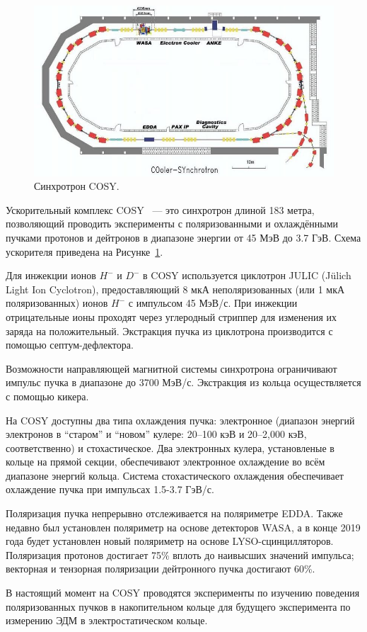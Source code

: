 
\begin{figure}[h]
	\centering
	\includegraphics[scale=.5]{images/chapter4/800px-COSY_Ring}
	\caption{Синхротрон COSY.\label{fig:COSY_Ring}}
\end{figure}

Ускорительный комплекс COSY~\cite{COSY-Ring} --- это синхротрон длиной 183 метра, позволяющий проводить эксперименты с поляризованными и охлаждёнными пучками протонов и дейтронов в диапазоне энергии от 45 МэВ до 3.7 ГэВ. Схема ускорителя приведена на Рисунке~\ref{fig:COSY_Ring}.

Для инжекции ионов $H^-$ и $D^-$ в COSY  используется циклотрон JULIC (J\"ulich Light Ion Cyclotron), предоставляющий 8 мкА неполяризованных (или 1 мкА поляризованных) ионов $H^-$ с импульсом 45 МэВ/с. При инжекции отрицательные ионы проходят через углеродный стриппер для изменения их заряда на положительный. Экстракция пучка из циклотрона производится с помощью септум-дефлектора.~\cite{JULIC-Injector}

Возможности направляющей магнитной системы синхротрона ограничивают импульс пучка в диапазоне до 3700 МэВ/с. Экстракция из кольца осуществляется с помощью кикера.

На COSY доступны два типа охлаждения пучка: электронное (диапазон энергий электронов в ``старом'' и ``новом'' кулере: 20--100 кэВ и 20--2,000 кэВ, соответственно) и стохастическое. 
%
Два электронных кулера, установленые в кольце на прямой секции, обеспечивают электронное охлаждение во всём диапазоне энергий кольца. Система стохастического охлаждения обеспечивает охлаждение пучка при импульсах 1.5-3.7 ГэВ/с.

Поляризация пучка непрерывно отслеживается на поляриметре  EDDA. Также недавно был установлен поляриметр на основе детекторов WASA, а в конце 2019 года будет установлен новый поляриметр на основе LYSO-сцинцилляторов.
Поляризация протонов достигает 75\% вплоть до наивысших значений импульса; векторная и тензорная поляризации дейтронного пучка достигают 60\%.

В настоящий момент на COSY проводятся эксперименты по изучению поведения поляризованных пучков в накопительном кольце для будущего эксперимента по измерению ЭДМ в электростатическом кольце.~\cite{Lehrach:Precursor2012, Lehrach:IPAC15, COSY:SpinTuneMapping, Wagner:BBA2018}